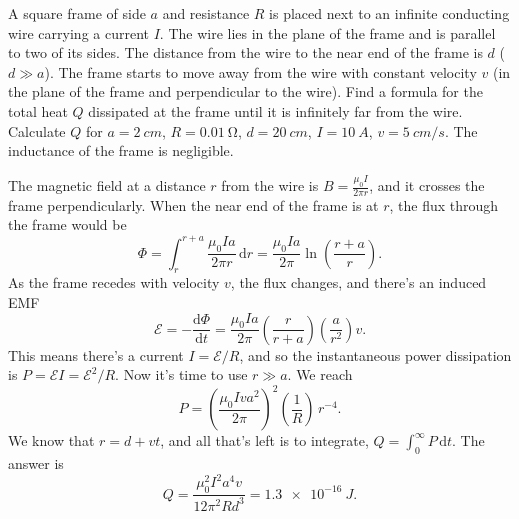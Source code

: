 \documentclass[../TST.tex]{subfiles}
\begin{document}
\begin{pproblem}
A square frame of side $a$ and resistance $R$ is placed  next to an infinite conducting wire carrying a current $I$. The wire lies in the plane of the frame and is parallel to two of its sides. The distance from the wire to the near end of the frame is $d$ ($d\gg a$). The frame starts to move away from the wire with constant velocity $v$ (in the plane of the frame and perpendicular to the wire). Find a formula for the total heat $Q$ dissipated at the frame until it is infinitely far from the wire. Calculate $Q$ for $a=\qty{2}{cm}$, $R=\qty{0.01}{\ohm}$, $d=\qty{20}{cm}$, $I=\qty{10}{A}$, $v=\qty{5}{cm/s}$. The inductance of the frame is negligible.
\end{pproblem}

\ifprob \else
\begin{solution} The magnetic field at a distance $r$ from the wire is $B=\frac{\mu_0I}{2\pi r}$, and it crosses the frame perpendicularly. When the near end of the frame is at $r$, the flux through the frame would be 
	\begin{equation*}
		\Phi = \int_r^{r+a}\frac{\mu_0 I a}{2\pi r}\,\mathrm{d}r= \frac{\mu_0Ia}{2\pi}\ln{\left( \frac{r+a}{r}\right)}
	.
	\end{equation*}
As the frame recedes with velocity $v$, the flux changes, and there's an induced EMF
\begin{equation*}
\mathcal{E}=-\frac{\mathrm{d}\Phi}{\mathrm{d}t}=\frac{\mu_0Ia}{2\pi}\left(\frac{r}{r+a}\right)\left( \frac{a}{r^2}\right)v
.
\end{equation*}
This means there's a current $I= \mathcal{E}/R$, and so the instantaneous power dissipation is $P= \mathcal{E}I = \mathcal{E}^2/R$. Now it's time to use $r\gg a$. We reach
\begin{equation*}
	P = \left(\frac{\mu_0Iva^2}{2\pi}\right)^2 \left(\frac{1}{R}\right)\, r^{-4}
.
\end{equation*}
We know that $r=d+vt$, and all that's left is to integrate, $Q=\int_0^\infty P\,\mathrm{d}t$. The answer is
\begin{equation*}
	\boxed{Q = \frac{\mu_0^2I^2a^4v}{12\pi^2Rd^3}=\qty{1.3e-16}{J}.}
\end{equation*}

\end{solution}
\fi
\end{document}
